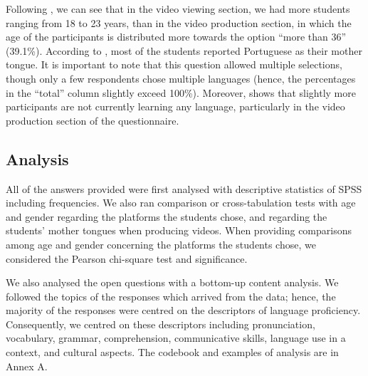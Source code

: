 Following , we can see that in the video viewing section, we had
more students ranging from 18 to 23 years, than in the video production
section, in which the age of the participants is distributed more
towards the option ``more than 36'' (39.1\%). According to , most
of the students reported Portuguese as their mother tongue. It is
important to note that this question allowed multiple selections, though
only a few respondents chose multiple languages (hence, the percentages
in the ``total'' column slightly exceed 100\%). Moreover,  shows
that slightly more participants are not currently learning any language,
particularly in the video production section of the questionnaire.

\subsection{Analysis}\label{sub-sec-analysis}

All of the answers provided were first analysed with descriptive
statistics of SPSS including frequencies. We also ran comparison or
cross-tabulation tests with age and gender regarding the platforms the
students chose, and regarding the students' mother tongues when
producing videos. When providing comparisons among age and gender
concerning the platforms the students chose, we considered the Pearson
chi-square test and significance.

We also analysed the open questions with a bottom-up content analysis.
We followed the topics of the responses which arrived from the data;
hence, the majority of the responses were centred on the descriptors of
language proficiency. Consequently, we centred on these descriptors
including pronunciation, vocabulary, grammar, comprehension,
communicative skills, language use in a context, and cultural aspects.
The codebook and examples of analysis are in Annex A.


